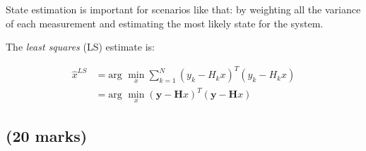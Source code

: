 State estimation is important for scenarios like that: by weighting all the variance of each measurement and estimating the most likely state for the system.

The \textit{least squares} (LS) estimate is:

\begin{align*}
    \hat{x}^{LS}
    &= \text{arg } \min_x \sum_{k=1}^{N} (y_k - H_k x)^T (y_k - H_k x) \\
    &= \text{arg } \min_x (\textbf{y} - \textbf{H} x)^T (\textbf{y} - \textbf{H} x)
\end{align*}


\subsection{(20 marks)}

\newpage
